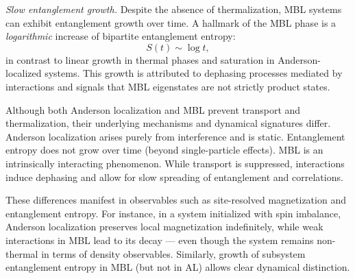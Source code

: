 \emph{Slow entanglement growth.} Despite the absence of thermalization, MBL systems can exhibit entanglement growth over time. A hallmark of the MBL phase is a \emph{logarithmic} increase of bipartite entanglement entropy:
\begin{equation*}
S(t) \sim \log t,
\end{equation*}
in contrast to linear growth in thermal phases and saturation in Anderson-localized systems. This growth is attributed to dephasing processes mediated by interactions and signals that MBL eigenstates are not strictly product states.



Although both Anderson localization and MBL prevent transport and thermalization, their underlying mechanisms and dynamical signatures differ. Anderson localization arises purely from interference and is static. Entanglement entropy does not grow over time (beyond single-particle effects). MBL is an intrinsically interacting phenomenon. While transport is suppressed, interactions induce dephasing and allow for slow spreading of entanglement and correlations.

These differences manifest in observables such as site-resolved magnetization and entanglement entropy. For instance, in a system initialized with spin imbalance, Anderson localization preserves local magnetization indefinitely, while weak interactions in MBL lead to its decay — even though the system remains non-thermal in terms of density observables. Similarly, growth of subsystem entanglement entropy in MBL (but not in AL) allows clear dynamical distinction.



